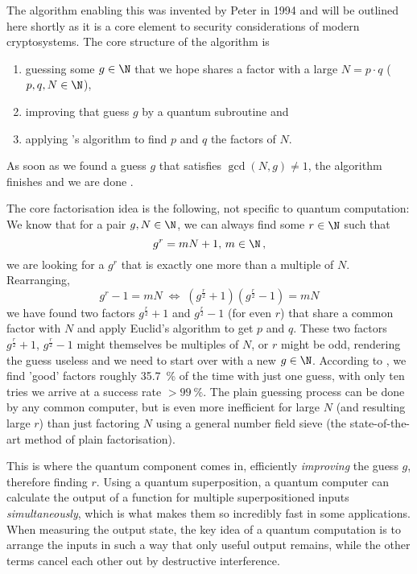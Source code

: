The algorithm enabling this was invented by Peter  in 1994 and will be outlined here shortly as it is a core element to security considerations of modern cryptosystems.
The core structure of the algorithm is
\begin{enumerate}
  \item guessing some $g \in \N$ that we hope shares a factor with a large $N = p \cdot q$ ($p, q, N \in \N$),
  \item improving that guess $g$ by a quantum subroutine and
  \item applying 's algorithm to find $p$ and $q$ the factors of $N$.
\end{enumerate}
As soon as we found a guess $g$ that satisfies $\gcd(N, g) \neq 1$, the algorithm finishes and we are done \parencite{1997-shors-algorithm}.

The core factorisation idea is the following, not specific to quantum computation: We know that for a pair $g, N \in \N$, we can always find some $r \in \N$ such that
$$g^r = m N + 1,\, m \in \N\,,$$
we are looking for a $g^r$ that is exactly one more than a multiple of $N$.
Rearranging,
$$g^r - 1 = m N \;\Longleftrightarrow\; (g^\frac{r}{2} + 1)(g^\frac{r}{2} - 1) = m N$$
we have found two factors $g^\frac{r}{2} + 1$ and $g^\frac{r}{2} - 1$ (for even $r$) that share a common factor with $N$ and apply Euclid's algorithm to get $p$ and $q$.
These two factors $g^\frac{r}{2} + 1$, $g^\frac{r}{2} - 1$ might themselves be multiples of $N$, or $r$ might be odd, rendering the guess useless and we need to start over with a new $g \in \N$.
According to \cite{1997-shors-algorithm}, we find 'good' factors roughly \SI{35.7}{\percent} of the time with just one guess, with only ten tries we arrive at a success rate $> \SI{99}{\percent}$.
The plain guessing process can be done by any common computer, but is even more inefficient for large $N$ (and resulting large $r$) than just factoring $N$ using a general number field sieve (the state-of-the-art method of plain factorisation).

This is where the quantum component comes in, efficiently \textit{improving} the guess $g$, therefore finding $r$.
Using a quantum superposition, a quantum computer can calculate the output of a function for multiple superpositioned inputs \textit{simultaneously}, which is what makes them so incredibly fast in some applications.
When measuring the output state, the key idea of a quantum computation is to arrange the inputs in such a way that only useful output remains, while the other terms cancel each other out by destructive interference.

